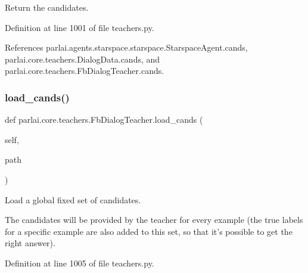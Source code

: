\begin{DoxyVerb}Return the candidates.\end{DoxyVerb}
 

Definition at line 1001 of file teachers.\+py.



References parlai.\+agents.\+starspace.\+starspace.\+Starspace\+Agent.\+cands, parlai.\+core.\+teachers.\+Dialog\+Data.\+cands, and parlai.\+core.\+teachers.\+Fb\+Dialog\+Teacher.\+cands.

\mbox{\label{classparlai_1_1core_1_1teachers_1_1FbDialogTeacher_ae6f10486ddf691ee868d33ea2c9dc295}} 
\subsubsection{\texorpdfstring{load\+\_\+cands()}{load\_cands()}}
{\footnotesize\ttfamily def parlai.\+core.\+teachers.\+Fb\+Dialog\+Teacher.\+load\+\_\+cands (\begin{DoxyParamCaption}\item[{}]{self,  }\item[{}]{path }\end{DoxyParamCaption})}

\begin{DoxyVerb}Load a global fixed set of candidates.

The candidates will be provided by the teacher for
every example (the true labels for a specific example are also added to
this set, so that it's possible to get the right answer).
\end{DoxyVerb}
 

Definition at line 1005 of file teachers.\+py.

\mbox{\label{classparlai_1_1core_1_1teachers_1_1FbDialogTeacher_a6cb23867e396fac5fdcde509b5da3942}} 
